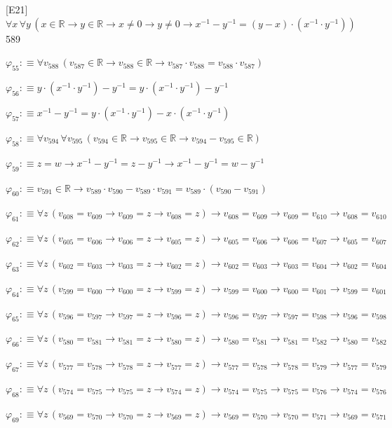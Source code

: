 \begin{fullproof}{[E21]}{$\forall x\,\forall y\,(x \in \mathbb{R} \to y \in \mathbb{R} \to x \neq 0 \to y \neq 0 \to x^{-1} - y^{-1} = (y - x) \cdot (x^{-1} \cdot y^{-1}))$}{589}
\begin{abbrevlist}
\item $\varphi_{55} :\equiv \forall v_{588}\,(v_{587} \in \mathbb{R} \to v_{588} \in \mathbb{R} \to v_{587} \cdot v_{588} = v_{588} \cdot v_{587})$
\item $\varphi_{56} :\equiv y \cdot (x^{-1} \cdot y^{-1}) - y^{-1} = y \cdot (x^{-1} \cdot y^{-1}) - y^{-1}$
\item $\varphi_{57} :\equiv x^{-1} - y^{-1} = y \cdot (x^{-1} \cdot y^{-1}) - x \cdot (x^{-1} \cdot y^{-1})$
\item $\varphi_{58} :\equiv \forall v_{594}\,\forall v_{595}\,(v_{594} \in \mathbb{R} \to v_{595} \in \mathbb{R} \to v_{594} - v_{595} \in \mathbb{R})$
\item $\varphi_{59} :\equiv z = w \to x^{-1} - y^{-1} = z - y^{-1} \to x^{-1} - y^{-1} = w - y^{-1}$
\item $\varphi_{60} :\equiv v_{591} \in \mathbb{R} \to v_{589} \cdot v_{590} - v_{589} \cdot v_{591} = v_{589} \cdot (v_{590} - v_{591})$
\item $\varphi_{61} :\equiv \forall z\,(v_{608} = v_{609} \to v_{609} = z \to v_{608} = z) \to v_{608} = v_{609} \to v_{609} = v_{610} \to v_{608} = v_{610}$
\item $\varphi_{62} :\equiv \forall z\,(v_{605} = v_{606} \to v_{606} = z \to v_{605} = z) \to v_{605} = v_{606} \to v_{606} = v_{607} \to v_{605} = v_{607}$
\item $\varphi_{63} :\equiv \forall z\,(v_{602} = v_{603} \to v_{603} = z \to v_{602} = z) \to v_{602} = v_{603} \to v_{603} = v_{604} \to v_{602} = v_{604}$
\item $\varphi_{64} :\equiv \forall z\,(v_{599} = v_{600} \to v_{600} = z \to v_{599} = z) \to v_{599} = v_{600} \to v_{600} = v_{601} \to v_{599} = v_{601}$
\item $\varphi_{65} :\equiv \forall z\,(v_{596} = v_{597} \to v_{597} = z \to v_{596} = z) \to v_{596} = v_{597} \to v_{597} = v_{598} \to v_{596} = v_{598}$
\item $\varphi_{66} :\equiv \forall z\,(v_{580} = v_{581} \to v_{581} = z \to v_{580} = z) \to v_{580} = v_{581} \to v_{581} = v_{582} \to v_{580} = v_{582}$
\item $\varphi_{67} :\equiv \forall z\,(v_{577} = v_{578} \to v_{578} = z \to v_{577} = z) \to v_{577} = v_{578} \to v_{578} = v_{579} \to v_{577} = v_{579}$
\item $\varphi_{68} :\equiv \forall z\,(v_{574} = v_{575} \to v_{575} = z \to v_{574} = z) \to v_{574} = v_{575} \to v_{575} = v_{576} \to v_{574} = v_{576}$
\item $\varphi_{69} :\equiv \forall z\,(v_{569} = v_{570} \to v_{570} = z \to v_{569} = z) \to v_{569} = v_{570} \to v_{570} = v_{571} \to v_{569} = v_{571}$

\end{abbrevlist}
\end{fullproof}

